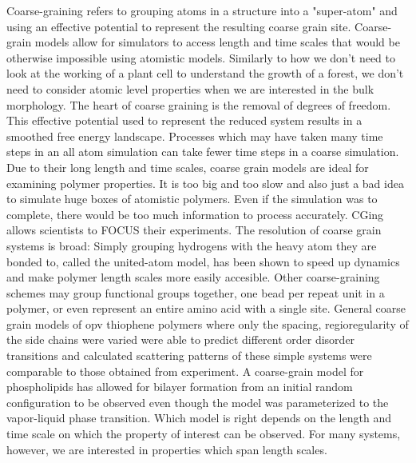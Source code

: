 Coarse-graining refers to grouping atoms in a structure into a "super-atom" and using an effective potential to represent the resulting coarse grain site.
Coarse-grain models allow for simulators to access length and time scales that would be otherwise impossible using atomistic models.
Similarly to how we don't need to look at the working of a plant cell to understand the growth of a forest, we don't need to consider atomic level properties when we are interested in the bulk morphology\cite{Muller-Plathe2002}.
The heart of coarse graining is the removal of degrees of freedom. 
This effective potential used to represent the reduced system results in a smoothed free energy landscape. 
Processes which may have taken many time steps in an all atom simulation can take fewer time steps in a coarse simulation\cite{Berendsen2010}.
Due to their long length and time scales, coarse grain models are ideal for examining polymer properties\cite{Gartner2019a}.
It is too big and too slow and also just a bad idea to simulate huge boxes of atomistic polymers.
Even if the simulation was to complete, there would be too much information to process accurately. 
CGing allows scientists to FOCUS their experiments\cite{Baschnagel2000}.
The resolution of coarse grain systems is broad:
Simply grouping hydrogens with the heavy atom they are bonded to, called the united-atom model, has been shown to speed up dynamics and make polymer length scales more easily accesible\cite{Paul1995a, Yang2006a}.
Other coarse-graining schemes may group functional groups together\cite{Berendsen2010, Jankowski2013, Marsh2014}, one bead per repeat unit in a polymer\cite{Lee2011}, or even represent an entire amino acid with a single site\cite{Peng2019a}.
General coarse grain models of opv thiophene polymers where only the spacing, regioregularity of the side chains were varied were able to predict different order disorder transitions and calculated scattering patterns of these simple systems were comparable to those obtained from experiment\cite{Jankowski2013, Marsh2014}.
A coarse-grain model for phospholipids has allowed for bilayer formation from an initial random configuration to be observed even though the model was parameterized to the vapor-liquid phase transition\cite{Shelley2001}.
Which model is right depends on the length and time scale on which the property of interest can be observed.
For many systems, however, we are interested in properties which span length scales.
